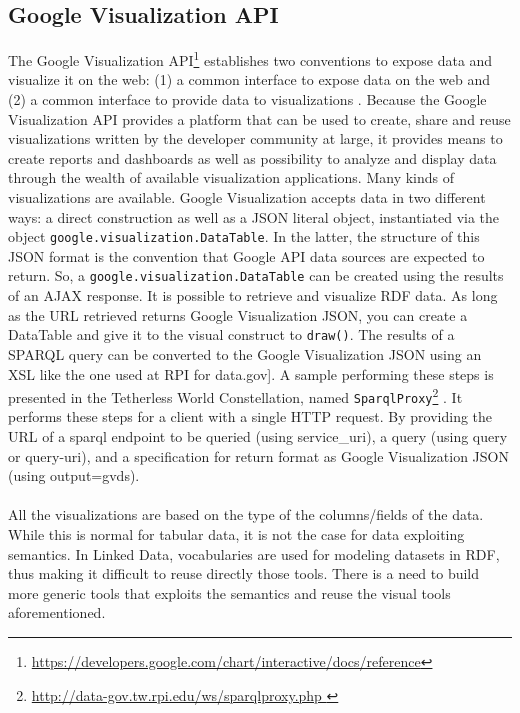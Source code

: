 \subsection{Google Visualization API}

The Google Visualization API\footnote{\url{https://developers.google.com/chart/interactive/docs/reference}} establishes two conventions to expose data and visualize it on the web: (1) a common interface to expose data on the web and (2) a common interface to provide data to visualizations \cite{rpi2012}.
Because the Google Visualization API provides a platform that can be used to create, share and reuse visualizations written by the developer community at large, it provides means to create reports and dashboards as well as possibility to analyze and display data through the wealth of available visualization applications. Many kinds of visualizations are available. Google Visualization accepts data in two different ways: a direct construction as well as  a JSON literal object, instantiated via the object \texttt{google.visualization.DataTable}. In the latter, the structure of this JSON format is the convention that Google API data sources are expected to return. So, a \texttt{google.visualization.DataTable} can be created using the results of an AJAX response.
It is possible to retrieve and visualize RDF data. As long as the URL retrieved returns Google Visualization JSON, you can create a DataTable and give it to the visual construct to \texttt{draw()}.  The results of a SPARQL query can be converted to the Google Visualization JSON using an XSL like the one used at RPI for data.gov]. A sample performing these steps is presented in the Tetherless World Constellation, named \texttt{SparqlProxy}\footnote{\url{http://data-gov.tw.rpi.edu/ws/sparqlproxy.php }} . It performs these steps for a client with a single HTTP request. By providing the URL of a sparql endpoint to be queried (using service\_uri), a query (using query or query-uri), and a specification for return format as Google Visualization JSON (using output=gvds). 



\paragraph{}
All the visualizations are based on the type of the columns/fields of the data. While this is normal for tabular data, it is not the case for data exploiting semantics. In Linked Data, vocabularies are used for modeling datasets in RDF, thus making it difficult to reuse directly those tools. There is a need to build more generic tools that exploits the semantics and reuse the visual tools aforementioned. 



